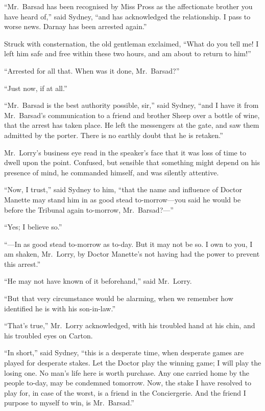 ``Mr.\ Barsad has been recognised by Miss Pross as the affectionate
brother you have heard of,'' said Sydney, ``and has acknowledged the
relationship.  I pass to worse news.  Darnay has been arrested again.''

Struck with consternation, the old gentleman exclaimed, ``What do you
tell me!  I left him safe and free within these two hours, and am
about to return to him!''

``Arrested for all that.  When was it done, Mr.\ Barsad?''

``Just now, if at all.''

``Mr.\ Barsad is the best authority possible, sir,'' said Sydney, ``and I
have it from Mr.\ Barsad's communication to a friend and brother Sheep
over a bottle of wine, that the arrest has taken place.  He left the
messengers at the gate, and saw them admitted by the porter.
There is no earthly doubt that he is retaken.''

Mr.\ Lorry's business eye read in the speaker's face that it was loss
of time to dwell upon the point.  Confused, but sensible that
something might depend on his presence of mind, he commanded himself,
and was silently attentive.

``Now, I trust,'' said Sydney to him, ``that the name and influence of
Doctor Manette may stand him in as good stead to-morrow---you said he
would be before the Tribunal again to-morrow, Mr.\ Barsad?---''

``Yes; I believe so.''

``---In as good stead to-morrow as to-day.  But it may not be so.
I own to you, I am shaken, Mr.\ Lorry, by Doctor Manette's not having
had the power to prevent this arrest.''

``He may not have known of it beforehand,'' said Mr.\ Lorry.

``But that very circumstance would be alarming, when we remember how
identified he is with his son-in-law.''

``That's true,'' Mr.\ Lorry acknowledged, with his troubled hand at his
chin, and his troubled eyes on Carton.

``In short,'' said Sydney, ``this is a desperate time, when desperate
games are played for desperate stakes.  Let the Doctor play the
winning game; I will play the losing one.  No man's life here is
worth purchase. Any one carried home by the people to-day, may be
condemned tomorrow.  Now, the stake I have resolved to play for, in
case of the worst, is a friend in the Conciergerie.  And the friend I
purpose to myself to win, is Mr.\ Barsad.''

